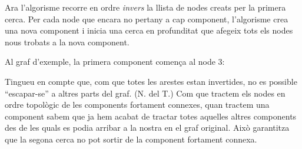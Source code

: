 Ara l'algorisme recorre en ordre \emph{invers} la llista de nodes
creats per la primera cerca. Per cada node que encara no pertany a cap
component, l'algorisme crea una nova component i inicia una cerca en
profunditat que afegeix tots els nodes nous trobats a la nova
component.

Al graf d'exemple, la primera component comença al node 3:


\begin{center}
\end{center}

Tingueu en compte que, com que totes les arestes estan invertides, no
es possible ``escapar-se'' a altres parts del graf. (N. del T.) Com
que tractem els nodes en ordre topològic de les components fortament
connexes, quan tractem una component sabem que ja hem acabat de
tractar totes aquelles altres components des de les quals es podia
arribar a la nostra en el graf original. Això garantitza que la segona
cerca no pot sortir de la component fortament connexa.


